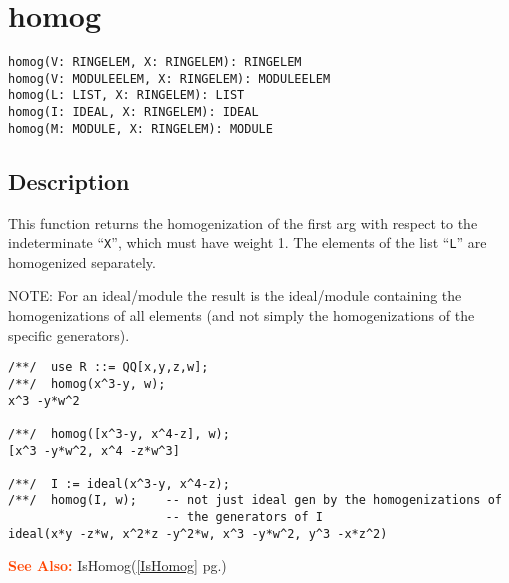 \documentclass[a4paper]{mybook}
\newenvironment{command}{}{} %
\newcommand\SeeAlso{\par\textcolor{OrangeRed}{\textbf{\large See Also: }}}
\begin{document}
\section{homog}
\label{homog}
\begin{command} %


\begin{Verbatim}[label=syntax, rulecolor=\color{MidnightBlue},
frame=single]
homog(V: RINGELEM, X: RINGELEM): RINGELEM
homog(V: MODULEELEM, X: RINGELEM): MODULEELEM
homog(L: LIST, X: RINGELEM): LIST
homog(I: IDEAL, X: RINGELEM): IDEAL
homog(M: MODULE, X: RINGELEM): MODULE
\end{Verbatim}


\subsection*{Description}

This function returns the homogenization of the first arg with respect
to the indeterminate ``\verb&X&'', which must have weight 1.  The elements
of the list ``\verb&L&'' are homogenized separately.
\par 
NOTE: For an ideal/module the result is the ideal/module containing the
homogenizations of all elements (and not simply the homogenizations of
the specific generators).
\begin{Verbatim}[label=example, rulecolor=\color{PineGreen}, frame=single]
/**/  use R ::= QQ[x,y,z,w];
/**/  homog(x^3-y, w);
x^3 -y*w^2

/**/  homog([x^3-y, x^4-z], w);
[x^3 -y*w^2, x^4 -z*w^3]

/**/  I := ideal(x^3-y, x^4-z);
/**/  homog(I, w);    -- not just ideal gen by the homogenizations of
                      -- the generators of I
ideal(x*y -z*w, x^2*z -y^2*w, x^3 -y*w^2, y^3 -x*z^2)
\end{Verbatim}


\SeeAlso %
  IsHomog(\ref{IsHomog} pg.\pageref{IsHomog})
\end{command} %
\end{document}
